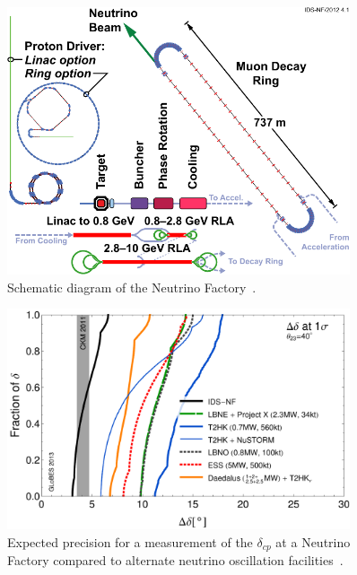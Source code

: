\begin{figure}[h!]
\centering
\includegraphics[width=0.9\textwidth]{figures/131112-IDS-NF.pdf}
\caption{Schematic diagram of the Neutrino Factory~\cite{Fix7}.}
\label{fig:nuFact}
\end{figure}

\begin{figure}[h!]
\centering
\includegraphics[width=0.9\textwidth]{figures/rdr-cp-precision-comparison-131216.pdf}
\caption{Expected precision for a measurement of the $\delta_{cp}$ at a Neutrino Factory compared to alternate neutrino oscillation facilities~\cite{Fix7}.}
\label{fig:nuFactExp}
\end{figure}

